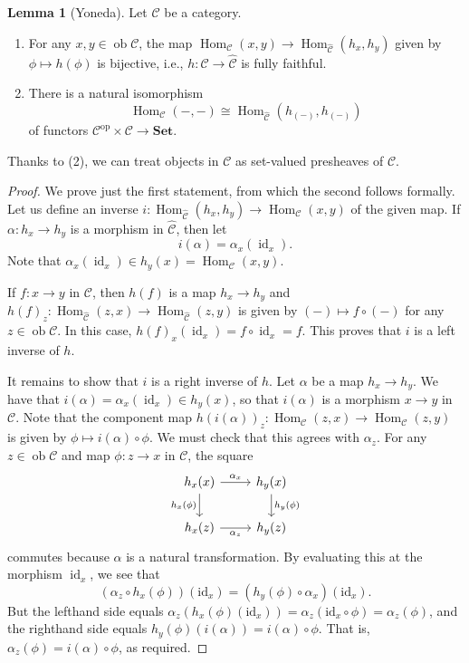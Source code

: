 \documentclass[10pt,letterpaper,cm]{nupset}
\theoremstyle{definition}
\theoremstyle{theorem}
\newtheorem{lemma}[definition]{Lemma}
\theoremstyle{remark}
\newcommand{\1}{\mathbf{1}}
\renewcommand{\c}{\mathscr{C}}
\newcommand{\0}{\vec 0}
\DeclareMathOperator{\id}{\mathrm{id}}
\DeclareMathOperator{\op}{op}
\DeclareMathOperator{\ob}{ob}
\DeclareMathOperator{\Hom}{Hom}
\begin{document}
\begin{lemma}[Yoneda] Let $\c$ be a category.
\begin{enumerate}[label=(\arabic*)]
\item For any $x, y \in \ob \c$, the map $\Hom_{\c}(x, y) \to \Hom_{\widehat{\c}}(h_x, h_y)$ given by $\phi \mapsto h(\phi)$ is bijective, i.e., $h : \c \to \widehat{\c}$ is fully faithful.
\item There is a natural isomorphism $$\Hom_{\c}(-, -) \cong \Hom_{\widehat{\c}}\left(h_{(-)}, h_{(-)}\right)$$ of functors $ \c^{\op} \times \c \to \mathbf{Set}$.
\end{enumerate}
\end{lemma}
Thanks to (2), we can treat objects in $\c$ as set-valued presheaves of $\c$.
\begin{proof}
We prove just the first statement, from which the second follows formally.
Let us define an inverse $i:  \Hom_{\widehat{\c}}(h_x, h_y) \to \Hom_{\c}(x, y)$ of the given map. If $\alpha : h_x \to h_y$ is a morphism in $\widehat{\c}$, then let $$i(\alpha) = \alpha_x(\id_x).$$ Note that $\alpha_x(\id_x) \in h_y(x) = \Hom_{\c}(x,y)$.

\medskip

 If $f: x \to y$ in $\c$, then $h(f)$ is a map $h_x \to h_y$ and $h(f)_z : \Hom_{\widehat{\c}}(z, x) \to \Hom_{\widehat{\c}}(z, y)$ is given by $(-) \mapsto f \circ (-)$ for any $z\in \ob \c$. In this case, $h(f)_x(\id_x) = f\circ \id_x = f$. This proves that $i$ is a left inverse of $h$.

\medskip

 It remains to show that $i$ is a right inverse of $h$. Let $\alpha$ be a map $h_x \to h_y$.  We have that $
i(\alpha) = \alpha_x(\id_x) \in h_y(x)$, so that $i(\alpha)$ is a morphism $x \to y$ in $\c$. Note that the component map $h(i(\alpha))_z : \Hom_{\c}(z, x) \to \Hom_{\c}(z, y)$ is given by $\phi \mapsto i(\alpha) \circ \phi.$ We must check that this agrees with $\alpha_z$. For any $z \in \ob \c$ and map $\phi : z \to x$ in $\c$, the square
\[
\begin{tikzcd}
h_x(x) \arrow[r, "\alpha_x"] \arrow[d, "h_x(\phi)"'] & h_y(x) \arrow[d, "h_y(\phi)"] \\
h_x(z) \arrow[r, "\alpha_z"'] & h_y(z)
\end{tikzcd}
\] commutes
because $\alpha$ is a natural transformation. By evaluating this at the morphism $\id_x$, we see that 
\[
\left(\alpha_{z} \circ h_{x}(\phi)\right)\left(\mathrm{id}_{x}\right)=\left(h_{y}(\phi) \circ \alpha_{x}\right)\left(\mathrm{id}_{x}\right)
.\] But the lefthand side equals $\alpha_{z}\left(h_{x}(\phi)\left(\mathrm{id}_{x}\right)\right)=\alpha_{z}\left(\mathrm{id}_{x} \circ \phi\right) = \alpha_z(\phi)$, and the righthand side equals $h_y(\phi)(i(\alpha)) = i(\alpha) \circ \phi$.
That is, $\alpha_z(\phi) = i(\alpha) \circ \phi$, as required.
\end{proof}
\end{document}
